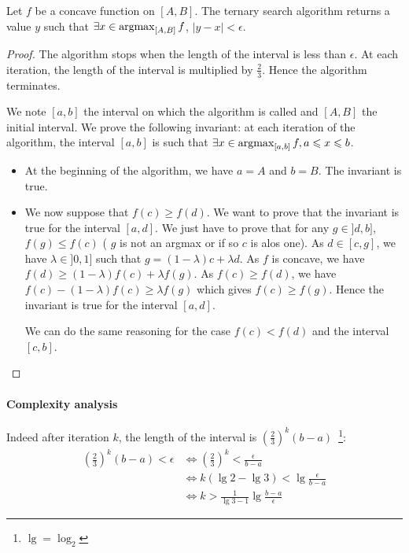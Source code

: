 \begin{thm}
    Let $f$ be a concave function on $[A, B]$. The ternary search algorithm returns a value $y$ such that $\exists x \in \operatorname*{argmax}_{[A, B]} f$, $|y - x| < \epsilon$.
\end{thm}
\begin{proof}
    The algorithm stops when the length of the interval is less than $\epsilon$. At each iteration, the length of the interval is multiplied by $\frac{2}{3}$. Hence the algorithm terminates.

    We note $[a, b]$ the interval on which the algorithm is called and $[A, B]$ the initial interval.
    We prove the following invariant: at each iteration of the algorithm, the interval $[a, b]$ is such that $\exists x \in \operatorname*{argmax}_{[a, b]} f, a \leqslant x \leqslant b$.
    \begin{itemize}
        \item At the beginning of the algorithm, we have $a = A$ and $b = B$. The invariant is true.
        \item We now suppose that $f(c) \geq f(d)$. We want to prove that the invariant is true for the interval $[a, d]$. We just have to prove that for any $g \in ]d, b]$, $f(g) \leq f(c)$ ( $g$ is not an argmax or if so $c$ is alos one). As $d \in [c, g]$, we have $\lambda \in ]0, 1]$ such that $g = (1 - \lambda)c + \lambda d$. As $f$ is concave, we have $f(d) \geq (1 - \lambda)f(c) + \lambda f(g)$. As $f(c) \geq f(d)$, we have $f(c) - (1 - \lambda)f(c) \geq \lambda f(g)$ which gives $f(c) \geq f(g)$. Hence the invariant is true for the interval $[a, d]$.
        
        We can do the same reasoning for the case $f(c) < f(d)$ and the interval $[c, b]$.
    \end{itemize}
\end{proof}

\paragraph{Complexity analysis}

Indeed after iteration $k$, the length of the interval is $\left(\frac{2}{3}\right)^k(b - a)$~\footnote{$\lg=\log_2$}:
\begin{align}
    \left(\frac{2}{3}\right)^k(b - a) < \epsilon &\Leftrightarrow \left(\frac{2}{3}\right)^k < \frac{\epsilon}{b - a} \\
    &\Leftrightarrow k (\lg 2 - \lg 3) < \lg \frac{\epsilon}{b - a} \\
    &\Leftrightarrow k > \frac{1}{\lg 3 - 1} \lg \frac{b - a}{\epsilon}
    \end{align}

